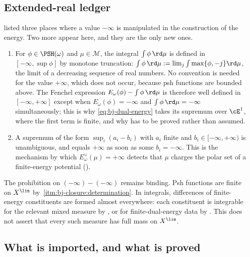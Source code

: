 \subsection{Extended-real ledger}
\label{sec:ch47-ledger}

 listed three places where a value $-\infty$ is
manipulated in the construction of the energy.  Two more appear here, and
they are the only new ones.

\begin{enumerate}
\item\label{itm:ch47-ledger:integral}
      For $\phi\in\PSH(\omega)$ and $\mu\in\mathcal M$, the integral
      $\int\phi\,\rd\mu$ is defined in $[-\infty,\sup\phi]$ by
      monotone truncation: $\int\phi\,\rd\mu:=\lim_j\int\max\{\phi,-j\}\rd\mu$,
      the limit of a decreasing sequence of real numbers.  No convention is
      needed for the value $+\infty$, which does not occur, because psh
      functions are bounded above.  The Fenchel expression
      $E_\omega(\phi)-\int\phi\,\rd\mu$ is therefore well defined in
      $[-\infty,+\infty]$ except when $E_\omega(\phi)=-\infty$ and
      $\int\phi\,\rd\mu=-\infty$ simultaneously; this is why
      \eqref{eq:bj-dual-energy} takes its supremum over $\cE^1$, where
      the first term is finite, and why
       has to be proved rather than assumed.
\item\label{itm:ch47-ledger:sup}
      A supremum of the form $\sup_i(a_i-b_i)$ with $a_i$ finite and
      $b_i\in[-\infty,+\infty)$ is unambiguous, and equals $+\infty$
      as soon as some $b_i=-\infty$.  This is the mechanism by which
      $E^\vee_\omega(\mu)=+\infty$ detects that $\mu$ charges the polar
      set of a finite-energy potential
      ().
\end{enumerate}

The prohibition on $(-\infty)-(-\infty)$ remains binding. Psh functions
are finite on $X^{\lin}$ by
\,\cref{itm:bj-closure:determination}.
In integrals, differences of finite-energy constituents are formed almost
everywhere: each constituent is integrable for the relevant mixed measure
by , or for finite-dual-energy data by
. This does not assert that every such measure
has full mass on $X^{\lin}$.

\subsection{What is imported, and what is proved}
\label{sec:ch47-imported}

